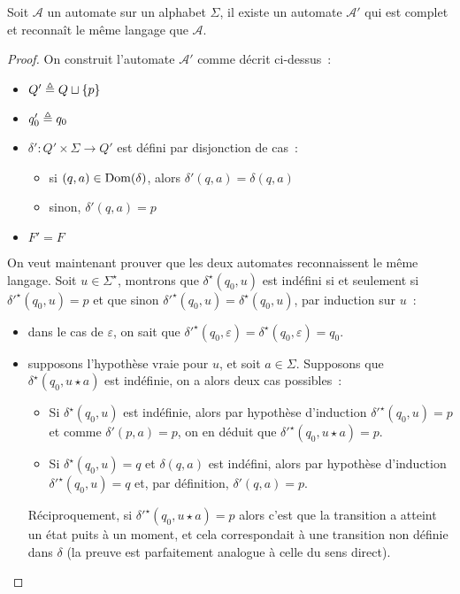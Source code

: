 \begin{proposition}
  Soit $\mathcal A$ un automate sur un alphabet $\Sigma$, il existe un automate
  $\mathcal A'$ qui est complet et reconnaît le même langage que $\mathcal A$.
\end{proposition}

\begin{proof}
  On construit l'automate $\mathcal A'$ comme décrit ci-dessus~:
  \begin{itemize}
  \item $Q' \triangleq Q \sqcup \{p\}$
  \item $q'_0 \triangleq q_0$
  \item $\delta' : Q' \times \Sigma \to Q'$ est défini par disjonction de cas~:
    \begin{itemize}
    \item si $(q,a) \in \operatorname{Dom}(\delta)$, alors $\delta'(q,a) = \delta(q,a)$
    \item sinon, $\delta'(q,a) = p$
    \end{itemize}
  \item $F' = F$
  \end{itemize}

  On veut maintenant prouver que les deux automates reconnaissent le même
  langage. Soit $u \in \Sigma^\star$, montrons que $\delta^\star(q_0,u)$ est
  indéfini si et seulement si $\delta'^\star(q_0,u) = p$ et que sinon
  $\delta'^\star(q_0,u) = \delta^\star(q_0,u)$, par induction sur $u$~:
  \begin{itemize}
  \item dans le cas de $\varepsilon$, on sait que
    $\delta'^\star(q_0,\varepsilon) = \delta^\star(q_0,\varepsilon) = q_0$.
  \item supposons l'hypothèse vraie pour $u$, et soit $a \in \Sigma$. Supposons
    que $\delta^\star(q_0,u\star a)$ est indéfinie, on a alors deux cas
    possibles~:
    \begin{itemize}
    \item Si $\delta^\star(q_0,u)$ est indéfinie, alors par hypothèse
      d'induction $\delta'^\star(q_0,u) = p$ et comme $\delta'(p,a) = p$, on en
      déduit que $\delta'^\star(q_0,u\star a) = p$.
    \item Si $\delta^\star(q_0,u) = q$ et $\delta(q,a)$ est indéfini, alors
      par hypothèse d'induction $\delta'^\star(q_0,u) = q$ et, par définition,
      $\delta'(q,a) = p$.
    \end{itemize}
    
    Réciproquement, si $\delta'^\star(q_0,u\star a) = p$ alors c'est que la
    transition a atteint un état puits à un moment, et cela correspondait à
    une transition non définie dans $\delta$ (la preuve est parfaitement
    analogue à celle du sens direct).


\end{itemize}
\end{proof}
